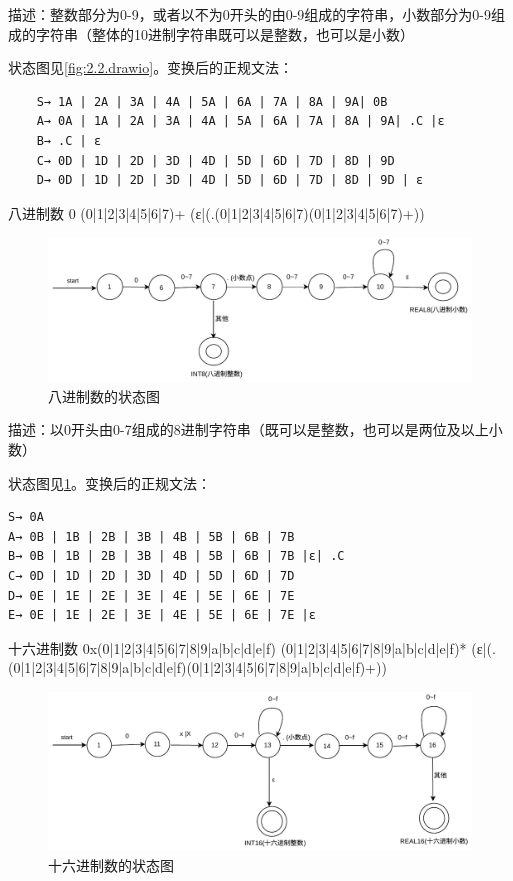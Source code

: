 \documentclass{ctexrep}
\begin{document}
\begin{outline}
        描述：整数部分为0-9，或者以不为0开头的由0-9组成的字符串，小数部分为0-9组成的字符串（整体的10进制字符串既可以是整数，也可以是小数）
        
        状态图见\cref{fig:2.2.drawio}。变换后的正规文法：

        \begin{verbatim}
    S→ 1A | 2A | 3A | 4A | 5A | 6A | 7A | 8A | 9A| 0B
    A→ 0A | 1A | 2A | 3A | 4A | 5A | 6A | 7A | 8A | 9A| .C |ε
    B→ .C | ε
    C→ 0D | 1D | 2D | 3D | 4D | 5D | 6D | 7D | 8D | 9D
    D→ 0D | 1D | 2D | 3D | 4D | 5D | 6D | 7D | 8D | 9D | ε            
        \end{verbatim}

        \2 八进制数 0 (0|1|2|3|4|5|6|7)+ (ε|(.(0|1|2|3|4|5|6|7)(0|1|2|3|4|5|6|7)+))

        \begin{figure}[htp]
            \centering
            \includegraphics[width=0.8\linewidth]{2.3.drawio.pdf}
            \caption{八进制数的状态图}
            \label{fig:2.3.drawio}
        \end{figure}

        描述：以0开头由0-7组成的8进制字符串（既可以是整数，也可以是两位及以上小数）

状态图见\cref{fig:2.3.drawio}。变换后的正规文法：
\begin{verbatim}
S→ 0A
A→ 0B | 1B | 2B | 3B | 4B | 5B | 6B | 7B
B→ 0B | 1B | 2B | 3B | 4B | 5B | 6B | 7B |ε| .C
C→ 0D | 1D | 2D | 3D | 4D | 5D | 6D | 7D
D→ 0E | 1E | 2E | 3E | 4E | 5E | 6E | 7E
E→ 0E | 1E | 2E | 3E | 4E | 5E | 6E | 7E |ε  
\end{verbatim}

\2 十六进制数  0x(0|1|2|3|4|5|6|7|8|9|a|b|c|d|e|f) (0|1|2|3|4|5|6|7|8|9|a|b|c\allowbreak |d|e|f)* (ε|(. (0|1|2|3|4|5|6|7|8|9|a|b|c|d|e|f)(0|1|2|3|4|5|6|7|8|9|a|\allowbreak b|c|d|e|f)+))

\begin{figure}[htp]
    \centering
    \includegraphics[width=0.8\linewidth]{2.4.drawio.pdf}
    \caption{十六进制数的状态图}
    \label{fig:2.4.drawio}
\end{figure}


\end{outline}
\end{document}
